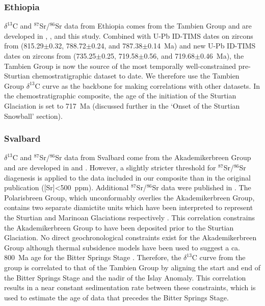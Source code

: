 \documentclass[11pt,letterpaper]{article}
\newcommand{\dC}{$\delta^{13}$C\xspace}
\newcommand{\SrSr}{$^{87}$Sr/$^{86}$Sr\xspace}
\begin{document}
\subsubsection*{Ethiopia}

\dC and \SrSr data from Ethiopia comes from the Tambien Group and are developed in \citet{Miller2009a}, \citet{Swanson-Hysell2015a}, and this study. Combined with U-Pb ID-TIMS dates on zircons from \citet{Swanson-Hysell2015a} (815.29$\pm$0.32, 788.72$\pm$0.24, and 787.38$\pm$0.14~Ma) and new U-Pb ID-TIMS dates on zircons from \citet{MacLennan2018a} (735.25$\pm$0.25, 719.58$\pm$0.56, and 719.68$\pm$0.46~Ma), the Tambien Group is now the source of the most temporally well-constrained pre-Sturtian chemostratigraphic dataset to date. We therefore use the Tambien Group \dC curve as the backbone for making correlations with other datasets. In the chemostratigraphic composite, the age of the initiation of the Sturtian Glaciation is set to 717~Ma (discussed further in the `Onset of the Sturtian Snowball' section).

\subsubsection*{Svalbard}

\dC and \SrSr data from Svalbard come from the Akademikerbreen Group and are developed in \citet{Halverson2007b} and \citet{Halverson2007a}. However, a slightly stricter threshold for \SrSr diagenesis is applied to the data included in our composite than in the original publication ([Sr]\textless500~ppm). Additional \SrSr data were published in \citet{Cox2016a}. The Polarisbreen Group, which unconformably overlies the Akademikerbreen Group, contains two separate diamictite units which have been interpreted to represent the Sturtian and Marinoan Glaciations respectively \citep{Halverson2004a}. This correlation constrains the Akademikerbreen Group to have been deposited prior to the Sturtian Glaciation. No direct geochronological constraints exist for the Akademikerbreen Group although thermal subsidence models have been used to suggest a ca. 800~Ma age for the Bitter Springs Stage \citep{Maloof2006a}. Therefore, the \dC curve from the group is correlated to that of the Tambien Group by aligning the start and end of the Bitter Springs Stage and the nadir of the Islay Anomaly. This correlation results in a near constant sedimentation rate between these constraints, which is used to estimate the age of data that precedes the Bitter Springs Stage.
\end{document}
